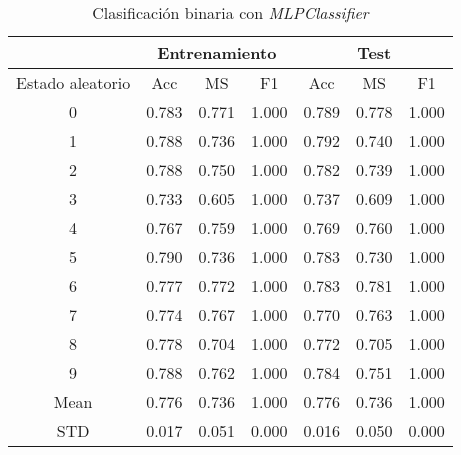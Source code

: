 \begin{table}[th]
	\centering
	\begin{tabular}{ |c|c|c|c|c|c|c| }
		\hline
		\rowcolor{LightCyan}
		 & \multicolumn{3}{c|}{Entrenamiento} & \multicolumn{3}{c|}{Test} \\
		\hline
		\rowcolor{LightCyan}
		 Estado aleatorio & Acc & MS & F1 & Acc & MS & F1 \\
		\hline
		0 & 0.783 & 0.771 & 1.000 & 0.789 & 0.778 & 1.000 \\
		1 & 0.788 & 0.736 & 1.000 & 0.792 & 0.740 & 1.000 \\
		2 & 0.788 & 0.750 & 1.000 & 0.782 & 0.739 & 1.000 \\
		3 & 0.733 & 0.605 & 1.000 & 0.737 & 0.609 & 1.000 \\
		4 & 0.767 & 0.759 & 1.000 & 0.769 & 0.760 & 1.000 \\
		5 & 0.790 & 0.736 & 1.000 & 0.783 & 0.730 & 1.000 \\
		6 & 0.777 & 0.772 & 1.000 & 0.783 & 0.781 & 1.000 \\
		7 & 0.774 & 0.767 & 1.000 & 0.770 & 0.763 & 1.000 \\
		8 & 0.778 & 0.704 & 1.000 & 0.772 & 0.705 & 1.000 \\
		9 & 0.788 & 0.762 & 1.000 & 0.784 & 0.751 & 1.000 \\
		Mean & 0.776 & 0.736 & 1.000 & 0.776 & 0.736 & 1.000 \\
		STD & 0.017 & 0.051 & 0.000 & 0.016 & 0.050 & 0.000 \\
		\hline
	\end{tabular}
	\caption{Clasificación binaria con \textit{MLPClassifier}}
	\label{tabla:mlp_bin}
\end{table}

